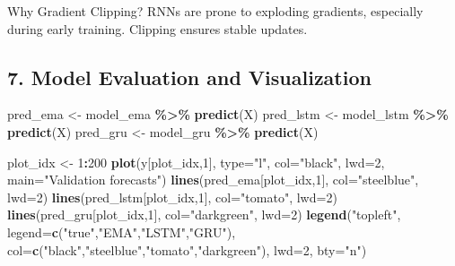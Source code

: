 \documentclass[
]{article}
\newenvironment{Shaded}{\begin{snugshade}}{\end{snugshade}}
\newcommand{\AttributeTok}[1]{\textcolor[rgb]{0.13,0.29,0.53}{#1}}
\newcommand{\DecValTok}[1]{\textcolor[rgb]{0.00,0.00,0.81}{#1}}
\newcommand{\FunctionTok}[1]{\textcolor[rgb]{0.13,0.29,0.53}{\textbf{#1}}}
\newcommand{\NormalTok}[1]{#1}
\newcommand{\OtherTok}[1]{\textcolor[rgb]{0.56,0.35,0.01}{#1}}
\newcommand{\SpecialCharTok}[1]{\textcolor[rgb]{0.81,0.36,0.00}{\textbf{#1}}}
\newcommand{\StringTok}[1]{\textcolor[rgb]{0.31,0.60,0.02}{#1}}
\begin{document}
Why Gradient Clipping? RNNs are prone to exploding gradients, especially
during early training. Clipping ensures stable updates.

\subsection{7. Model Evaluation and
Visualization}\label{model-evaluation-and-visualization}

\begin{Shaded}
\begin{Highlighting}[]
\NormalTok{pred\_ema }\OtherTok{\textless{}{-}}\NormalTok{ model\_ema  }\SpecialCharTok{\%\textgreater{}\%} \FunctionTok{predict}\NormalTok{(X)}
\NormalTok{pred\_lstm }\OtherTok{\textless{}{-}}\NormalTok{ model\_lstm }\SpecialCharTok{\%\textgreater{}\%} \FunctionTok{predict}\NormalTok{(X)}
\NormalTok{pred\_gru }\OtherTok{\textless{}{-}}\NormalTok{ model\_gru  }\SpecialCharTok{\%\textgreater{}\%} \FunctionTok{predict}\NormalTok{(X)}

\NormalTok{plot\_idx }\OtherTok{\textless{}{-}} \DecValTok{1}\SpecialCharTok{:}\DecValTok{200}
\FunctionTok{plot}\NormalTok{(y[plot\_idx,}\DecValTok{1}\NormalTok{], }\AttributeTok{type=}\StringTok{"l"}\NormalTok{, }\AttributeTok{col=}\StringTok{"black"}\NormalTok{, }\AttributeTok{lwd=}\DecValTok{2}\NormalTok{, }\AttributeTok{main=}\StringTok{"Validation forecasts"}\NormalTok{)}
\FunctionTok{lines}\NormalTok{(pred\_ema[plot\_idx,}\DecValTok{1}\NormalTok{],  }\AttributeTok{col=}\StringTok{"steelblue"}\NormalTok{, }\AttributeTok{lwd=}\DecValTok{2}\NormalTok{)}
\FunctionTok{lines}\NormalTok{(pred\_lstm[plot\_idx,}\DecValTok{1}\NormalTok{], }\AttributeTok{col=}\StringTok{"tomato"}\NormalTok{, }\AttributeTok{lwd=}\DecValTok{2}\NormalTok{)}
\FunctionTok{lines}\NormalTok{(pred\_gru[plot\_idx,}\DecValTok{1}\NormalTok{],  }\AttributeTok{col=}\StringTok{"darkgreen"}\NormalTok{, }\AttributeTok{lwd=}\DecValTok{2}\NormalTok{)}
\FunctionTok{legend}\NormalTok{(}\StringTok{"topleft"}\NormalTok{, }\AttributeTok{legend=}\FunctionTok{c}\NormalTok{(}\StringTok{"true"}\NormalTok{,}\StringTok{"EMA"}\NormalTok{,}\StringTok{"LSTM"}\NormalTok{,}\StringTok{"GRU"}\NormalTok{),}
       \AttributeTok{col=}\FunctionTok{c}\NormalTok{(}\StringTok{"black"}\NormalTok{,}\StringTok{"steelblue"}\NormalTok{,}\StringTok{"tomato"}\NormalTok{,}\StringTok{"darkgreen"}\NormalTok{), }\AttributeTok{lwd=}\DecValTok{2}\NormalTok{, }\AttributeTok{bty=}\StringTok{"n"}\NormalTok{)}
\end{Highlighting}
\end{Shaded}
\end{document}
